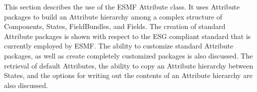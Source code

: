 %


This section describes the use of the ESMF Attribute class.  It uses Attribute packages to build an Attribute hierarchy among a complex structure of Components, States, FieldBundles, and Fields.  The creation of standard Attribute packages is shown with respect to the ESG compliant standard that is currently employed by ESMF.  The ability to customize standard Attribute packages, as well as create completely customized packages is also discussed.  The retrieval of default Attributes, the ability to copy an Attribute hierarchy between States, and the options for writing out the contents of an Attribute hierarchy are also discussed.



